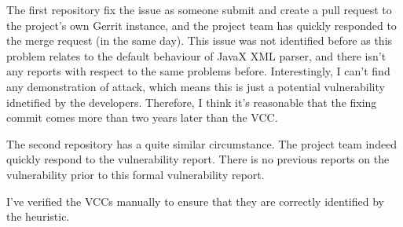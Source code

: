 \documentclass[12pt]{article}
\begin{document}
The first repository fix the issue as someone submit and create a pull request to the project's own Gerrit instance, and the project team has quickly responded to the merge request (in the same day). This issue was not identified before as this problem relates to the default behaviour of JavaX XML parser, and there isn't any reports with respect to the same problems before. Interestingly, I can't find any demonstration of attack, which means this is just a potential vulnerability idnetified by the developers. Therefore, I think it's reasonable that the fixing commit comes more than two years later than the VCC.

The second repository has a quite similar circumstance. The project team indeed quickly respond to the vulnerability report. There is no previous reports on the vulnerability prior to this formal vulnerability report.

I've verified the VCCs manually to ensure that they are correctly identified by the heuristic.
\end{document}
